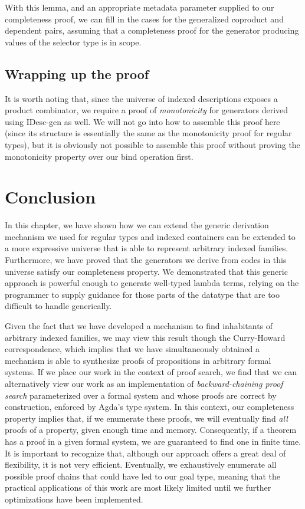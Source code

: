 \documentclass[a4paper,msc,twosized=semi]{uustthesis}
\let\oldemph\emph
\renewcommand\emph[1]{{\large\oldemph{#1}}}
\newcommand{\agda}[1]{{\agdafontinline\color{agdacolor}#1}}
\begin{document}
  With this lemma, and an appropriate metadata parameter supplied to our completeness 
  proof, we can fill in the cases for the generalized coproduct and dependent pairs, 
  assuming that a completeness proof for the generator producing values of the 
  selector type is in scope. 

\subsection{Wrapping up the proof}

  It is worth noting that, since the universe of indexed descriptions exposes a 
  product combinator, we require a proof of \emph{monotonicity} for generators derived 
  using \agda{IDesc-gen} as well. We will not go into how to assemble this proof here 
  (since its structure is essentially the same as the monotonicity proof for regular 
  types), but it is obviously not possible to assemble this proof without proving the 
  monotonicity property over our bind operation first. 

\section*{Conclusion}

  In this chapter, we have shown how we can extend the generic derivation mechanism we 
  used for regular types and indexed containers can be extended to a more expressive 
  universe that is able to represent arbitrary indexed families. Furthermore, we have 
  proved that the generators we derive from codes in this universe satisfy our 
  completeness property. We demonstrated that this generic approach is powerful enough 
  to generate well-typed lambda terms, relying on the programmer to supply guidance 
  for those parts of the datatype that are too difficult to handle generically. 

  Given the fact that we have developed a mechanism to find inhabitants of arbitrary 
  indexed families, we may view this result though the Curry-Howard correspondence, 
  which implies that we have simultaneously obtained a mechanism is able to synthesize 
  proofs of propositions in arbitrary formal systems. If we place our work in the 
  context of proof search, we find that we can alternatively view our work as an 
  implementation of \emph{backward-chaining proof search} \cite{miller1991uniform} 
  parameterized over a formal system and whose proofs are correct by construction, 
  enforced by Agda's type system. In this context, our completeness property implies 
  that, if we enumerate these proofs, we will eventually find \emph{all} proofs of a 
  property, given enough time and memory. Consequently, if a theorem has a proof in a 
  given formal system, we are guaranteed to find one in finite time. It is important 
  to recognize that, although our approach offers a great deal of flexibility, it is 
  not very efficient. Eventually, we exhaustively enumerate all possible proof chains 
  that could have led to our goal type, meaning that the practical applications of 
  this work are most likely limited until we further optimizations have been 
  implemented. 
\end{document}
